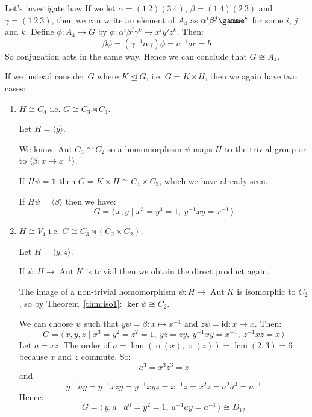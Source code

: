 \documentclass[a4paper, oneside, 12pt, final]{article}
\theoremstyle{definition}
\DeclareMathOperator{\Aut}{Aut}
\DeclareMathOperator{\order}{o}
\DeclareMathOperator{\lcm}{lcm}
\begin{document}
\begin{enumerate}
        Let's investigate haw
        If we let \(\alpha = (1\ 2)(3\ 4)\), \(\beta = (1\ 4)(2\ 3)\) and \(\gamma = (1\ 2\ 3)\), then we can write an
        element of \(A_4\) as \(\alpha^i\beta^j\gamme^k\) for some \(i\), \(j\) and \(k\).
        Define \(\phi:A_4 \to G\) by \(\phi:\alpha^i\beta^j\gamma^k \mapsto x^{i}y^{j}z^{k}\).
        Then:
        \[\beta\phi = (\gamma^{-1}\alpha\gamma)\phi = c^{-1}ac = b\]
        So conjugation acts in the same way.
        Hence we can conclude that \(G \cong A_4\).
\end{enumerate}

If we instead consider \(G\) where \(K \unlhd G\), i.e. \(G = K \rtimes H\), then we again have two cases:

\begin{enumerate}
    \item \(H \cong C_4\) i.e. \(G \cong C_3 \rtimes C_4\).

        Let \(H = \langle y \rangle\).

        We know \(\Aut{C_3} \cong C_2\) so a homomorphism \(\psi\) maps \(H\) to the trivial group or to \(\langle
        \beta:x \mapsto x^{-1} \rangle\).

        If \(H\psi = \bm{1}\) then \(G = K \times H \cong C_4 \times C_3\), which we have already seen.

        If \(H\psi = \langle \beta \rangle\) then we have:
        \[G = \langle\, x, y \mid x^3 = y^4 = 1,\ y^{-1}xy = x^{-1}\,\rangle\]

    \item \(H \cong V_4\) i.e. \(G \cong C_3 \rtimes (C_2 \times C_2)\).

        Let \(H = \langle y, z \rangle\).

        If \(\psi:H \to \Aut{K}\) is trivial then we obtain the direct product again.

        The image of a non-trivial homomorphism \(\psi:H \to \Aut{K}\) is isomorphic to \(C_2\), so by
        Theorem~\ref{thm:iso1}: \(\ker{\psi} \cong C_2\).

        We can choose \(\psi\) such that \(y\psi = \beta:x \mapsto x^{-1}\) and \(z\psi = \text{id}:x \mapsto x\).
        Then:
        \[G = \langle\, x, y, z \mid x^3 = y^2 = z^2 = 1,\ yz = zy,\ y^{-1}xy = x^{-1},\ z^{-1}xz = x\,\rangle\]
        Let \(a = xz\).
        The order of \(a = \lcm{(\order{(x)}, \order{(z)})} = \lcm{(2, 3)} = 6\) because \(x\) and \(z\) commute.
        So:
        \[a^3 = x^3z^3 = z\]
        and
        \[ y^{-1}ay = y^{-1}xzy = y^{-1}xyz = x^{-1}z = x^2z = a^2a^3 = a^{-1}\]
        Hence:
        \[G = \langle\, y, a \mid a^6 = y^2 = 1,\ a^{-1}ay = a^{-1}\,\rangle
        \cong D_{12}\]
\end{enumerate}
\end{document}
